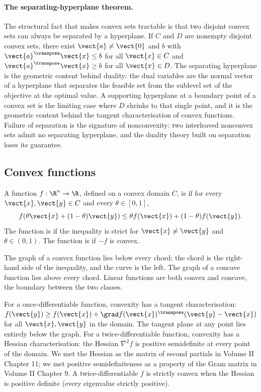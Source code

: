 \paragraph{The separating-hyperplane theorem.}
The structural fact that makes convex sets tractable is that two
disjoint convex sets can always be separated by a hyperplane. If
$C$ and $D$ are nonempty disjoint convex sets, there exist
$\vect{a} \neq \vect{0}$ and $b$ with $\vect{a}^{\transpose}
\vect{x} \leq b$ for all $\vect{x} \in C$ and $\vect{a}^{\transpose}
\vect{x} \geq b$ for all $\vect{x} \in D$. The separating
hyperplane is the geometric content behind duality: the dual
variables are the normal vector of a hyperplane that separates the
feasible set from the sublevel set of the objective at the optimal
value. A supporting hyperplane at a boundary point of a convex set
is the limiting case where $D$ shrinks to that single point, and
it is the geometric content behind the tangent characterisation of
convex functions. Failure of separation is the signature of
nonconvexity: two interleaved nonconvex sets admit no separating
hyperplane, and the duality theory built on separation loses its
guarantee.

\subsection{Convex functions}

\begin{definition}
A function $f : \R^{n} \to \R$, defined on a convex domain $C$, is
 if for every $\vect{x}, \vect{y} \in C$ and every
$\theta \in [0, 1]$,
\[
f(\theta \vect{x} + (1 - \theta) \vect{y}) \leq
\theta f(\vect{x}) + (1 - \theta) f(\vect{y}).
\]
The function is  if the inequality is
strict for $\vect{x} \neq \vect{y}$ and $\theta \in (0, 1)$. The
function is  if $-f$ is convex.
\end{definition}

The graph of a convex function lies below every chord; the chord
is the right-hand side of the inequality, and the curve is the
left. The graph of a concave function lies above every chord.
Linear functions are both convex and concave, the boundary
between the two classes.

For a once-differentiable function, convexity has a tangent
characterisation: $f(\vect{y}) \geq f(\vect{x}) + \grad
f(\vect{x})^{\transpose} (\vect{y} - \vect{x})$ for all
$\vect{x}, \vect{y}$ in the domain. The tangent plane at any
point lies entirely below the graph. For a twice-differentiable
function, convexity has a Hessian characterisation: the Hessian
$\nabla^{2} f$ is positive semidefinite at every point of the
domain. We met the Hessian as the matrix of second partials in
Volume II Chapter 11; we met positive semidefiniteness as a
property of the Gram matrix in Volume II Chapter 9. A
twice-differentiable $f$ is strictly convex when the Hessian is
positive definite (every eigenvalue strictly positive).

